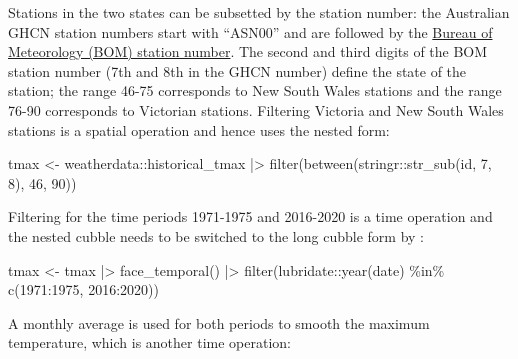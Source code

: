 \documentclass{article}
\newenvironment{Shaded}{\begin{snugshade}}{\end{snugshade}}
\newcommand{\DecValTok}[1]{\textcolor[rgb]{0.00,0.00,0.81}{#1}}
\newcommand{\FunctionTok}[1]{\textcolor[rgb]{0.00,0.00,0.00}{#1}}
\newcommand{\NormalTok}[1]{#1}
\newcommand{\OtherTok}[1]{\textcolor[rgb]{0.56,0.35,0.01}{#1}}
\newcommand{\SpecialCharTok}[1]{\textcolor[rgb]{0.00,0.00,0.00}{#1}}
\begin{document}
Stations in the two states can be subsetted by the station number: the Australian GHCN station numbers start with ``ASN00'' and are followed by the \href{http://www.bom.gov.au/climate/cdo/about/site-num.shtml}{Bureau of Meteorology (BOM) station number}. The second and third digits of the BOM station number (7th and 8th in the GHCN number) define the state of the station; the range 46-75 corresponds to New South Wales stations and the range 76-90 corresponds to Victorian stations. Filtering Victoria and New South Wales stations is a spatial operation and hence uses the nested form:

\begin{Shaded}
\begin{Highlighting}[]
\NormalTok{tmax }\OtherTok{\textless{}{-}}\NormalTok{ weatherdata}\SpecialCharTok{::}\NormalTok{historical\_tmax }\SpecialCharTok{|\textgreater{}}
  \FunctionTok{filter}\NormalTok{(}\FunctionTok{between}\NormalTok{(stringr}\SpecialCharTok{::}\FunctionTok{str\_sub}\NormalTok{(id, }\DecValTok{7}\NormalTok{, }\DecValTok{8}\NormalTok{), }\DecValTok{46}\NormalTok{, }\DecValTok{90}\NormalTok{))}
\end{Highlighting}
\end{Shaded}

Filtering for the time periods 1971-1975 and 2016-2020 is a time operation and the nested cubble needs to be switched to the long cubble form by :

\begin{Shaded}
\begin{Highlighting}[]
\NormalTok{tmax }\OtherTok{\textless{}{-}}\NormalTok{ tmax }\SpecialCharTok{|\textgreater{}}
  \FunctionTok{face\_temporal}\NormalTok{() }\SpecialCharTok{|\textgreater{}}
  \FunctionTok{filter}\NormalTok{(lubridate}\SpecialCharTok{::}\FunctionTok{year}\NormalTok{(date) }\SpecialCharTok{\%in\%} \FunctionTok{c}\NormalTok{(}\DecValTok{1971}\SpecialCharTok{:}\DecValTok{1975}\NormalTok{, }\DecValTok{2016}\SpecialCharTok{:}\DecValTok{2020}\NormalTok{))}
\end{Highlighting}
\end{Shaded}

A monthly average is used for both periods to smooth the maximum temperature, which is another time operation:
\end{document}
